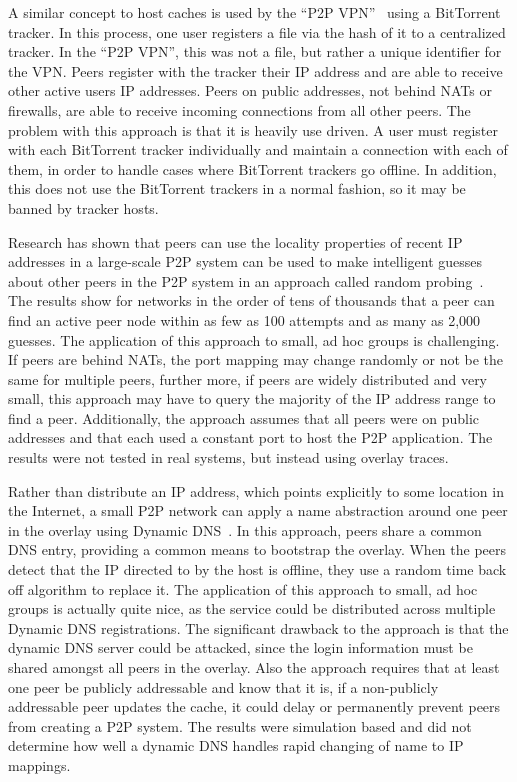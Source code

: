 \documentclass[conference]{IEEEtran}
\begin{document}
A similar concept to host caches is used by the ``P2P VPN''~\cite{p2pvpn} using
a BitTorrent tracker.  In this process, one user registers a file via the hash
of it to a centralized tracker.  In the ``P2P VPN'', this was not a file, but
rather a unique identifier for the VPN.  Peers register with the tracker their
IP address and are able to receive other active users IP addresses.  Peers on
public addresses, not behind NATs or firewalls, are able to receive incoming
connections from all other peers.  The problem with this approach is that it is
heavily use driven.  A user must register with each BitTorrent tracker
individually and maintain a connection with each of them, in order to handle
cases where BitTorrent trackers go offline.  In addition, this does not use the
BitTorrent trackers in a normal fashion, so it may be banned by tracker hosts.

Research has shown that peers can use the locality properties of recent IP
addresses in a large-scale P2P system can be used to make intelligent guesses
about other peers in the P2P system in an approach called random
probing~\cite{bootstrapping_p2p, locality_aware}.  The results show for
networks in the order of tens of thousands that a peer can find an active peer
node within as few as 100 attempts and as many as 2,000 guesses.  The
application of this approach to small, ad hoc groups is challenging.  If peers
are behind NATs, the port mapping may change randomly or not be the same for
multiple peers, further more, if peers are widely distributed and very small,
this approach may have to query the majority of the IP address range to find a
peer.  Additionally, the approach assumes that all peers were on public
addresses and that each used a constant port to host the P2P application.  The
results were not tested in real systems, but instead using overlay traces.

Rather than distribute an IP address, which points explicitly to some location
in the Internet, a small P2P network can apply a name abstraction around one
peer in the overlay using Dynamic DNS~\cite{bootstrapping_ddns}.  In this
approach, peers share a common DNS entry, providing a common means to bootstrap
the overlay.  When the peers detect that the IP directed to by the host is
offline, they use a random time back off algorithm to replace it.  The
application of this approach to small, ad hoc groups is actually quite nice, as
the service could be distributed across multiple Dynamic DNS registrations.
The significant drawback to the approach is that the dynamic DNS server could
be attacked, since the login information must be shared amongst all peers in
the overlay.  Also the approach requires that at least one peer be publicly
addressable and know that it is, if a non-publicly addressable peer updates the
cache, it could delay or permanently prevent peers from creating a P2P system.
The results were simulation based and did not determine how well a dynamic DNS
handles rapid changing of name to IP mappings.
\end{document}

